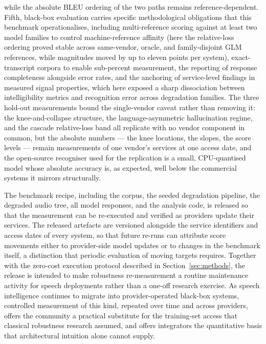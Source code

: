 while the
absolute BLEU ordering of the two paths remains reference-dependent. Fifth,
black-box evaluation carries specific methodological obligations that this
benchmark operationalises, including multi-reference scoring against at
least two model families to control machine-reference affinity (here the
relative-loss ordering proved stable across same-vendor, oracle, and
family-disjoint GLM references, while magnitudes moved by up to eleven
points per system), exact-transcript corpora to enable sub-percent
measurement, the reporting of response completeness alongside error rates,
and the anchoring of service-level findings in measured signal properties,
which here exposed a sharp dissociation between intelligibility metrics and
recognition error across degradation families. The three hold-out
measurements bound the single-vendor caveat rather than removing it: the
knee-and-collapse structure, the language-asymmetric hallucination regime,
and the cascade relative-loss band all replicate with no vendor component
in common, but the absolute numbers --- the knee locations, the slopes, the
score levels --- remain measurements of one vendor's services at one access
date, and the open-source recogniser used for the replication is a
small, CPU-quantised model whose absolute accuracy is, as expected, well
below the commercial systems it mirrors structurally.

The benchmark recipe, including the corpus, the seeded degradation pipeline,
the degraded audio tree, all model responses, and the analysis code, is
released so that the measurement can be re-executed and verified as
providers update their services. The released artefacts are versioned alongside the service
identifiers and access dates of every system, so that future re-runs can
attribute score movements either to provider-side model updates or to
changes in the benchmark itself, a distinction that periodic evaluation of
moving targets requires. Together with the zero-cost execution protocol
described in Section~\ref{sec:methods}, the release is intended to make
robustness re-measurement a routine maintenance activity for speech
deployments rather than a one-off research exercise. As
speech intelligence continues to migrate into provider-operated black-box
systems, controlled measurement of this kind, repeated over time and across
providers, offers the community a practical substitute for the training-set
access that classical robustness research assumed, and offers integrators
the quantitative basis that architectural intuition alone cannot supply.
